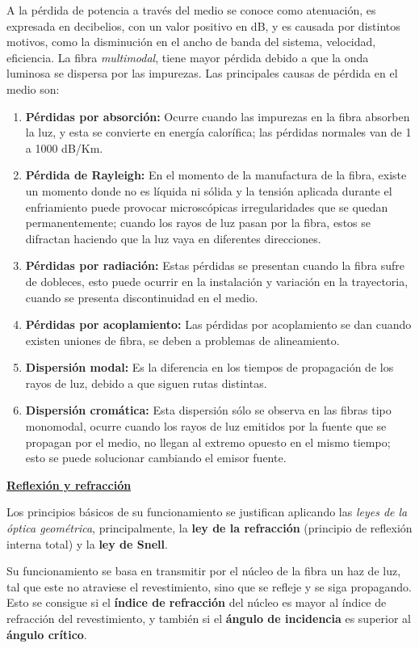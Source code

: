 \documentclass[10pt,a4paper]{article}
\begin{document}
A la pérdida de potencia a través del medio se conoce como atenuación, es expresada en decibelios, con un valor positivo en dB, y es causada por distintos motivos, como la disminución en el ancho de banda del sistema, velocidad, eficiencia. La fibra \textit{multimodal}, tiene mayor pérdida debido a que la onda luminosa se dispersa por las impurezas. Las principales causas de pérdida en el medio son:
\begin{enumerate}[+]
\item \textbf{Pérdidas por absorción:} Ocurre cuando las impurezas en la fibra absorben la luz, y esta se convierte en energía calorífica; las pérdidas normales van de 1 a 1000 dB/Km.
\item \textbf{Pérdida de Rayleigh:} En el momento de la manufactura de la fibra, existe un momento donde no es líquida ni sólida y la tensión aplicada durante el enfriamiento puede provocar microscópicas irregularidades que se quedan permanentemente; cuando los rayos de luz pasan por la fibra, estos se difractan haciendo que la luz vaya en diferentes direcciones.
\item \textbf{Pérdidas por radiación:} Estas pérdidas se presentan cuando la fibra sufre de dobleces, esto puede ocurrir en la instalación y variación en la trayectoria, cuando se presenta discontinuidad en el medio.
\item \textbf{Pérdidas por acoplamiento:} Las pérdidas por acoplamiento se dan cuando existen uniones de fibra, se deben a problemas de alineamiento.
\item \textbf{Dispersión modal:} Es la diferencia en los tiempos de propagación de los rayos de luz, debido a que siguen rutas distintas.
\item \textbf{Dispersión cromática:} Esta dispersión sólo se observa en las fibras tipo monomodal, ocurre cuando los rayos de luz emitidos por la fuente que se propagan por el medio, no llegan al extremo opuesto en el mismo tiempo; esto se puede solucionar cambiando el emisor fuente.
\end{enumerate}

\underline{\textbf{Reflexión y refracción}}

Los principios básicos de su funcionamiento se justifican aplicando las \textit{leyes de la óptica geométrica}, principalmente, la \textbf{ley de la refracción} (principio de reflexión interna total) y la \textbf{ley de Snell}.

Su funcionamiento se basa en transmitir por el núcleo de la fibra un haz de luz, tal que este no atraviese el revestimiento, sino que se refleje y se siga propagando. Esto se consigue si el \textbf{índice de refracción} del núcleo es mayor al índice de refracción del revestimiento, y también si el \textbf{ángulo de incidencia} es superior al \textbf{ángulo crítico}.
\end{document}
